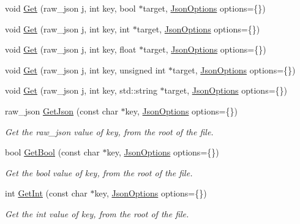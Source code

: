 \begin{DoxyCompactItemize}
void \hyperlink{classTarbora_1_1Json_a26d06b09cfa1ce6a53d9ad9dc19b0b5f}{Get} (raw\+\_\+json j, int key, bool $\ast$target, \hyperlink{structTarbora_1_1JsonOptions}{Json\+Options} options=\{\})
\item 
void \hyperlink{classTarbora_1_1Json_a050ea4e68695634b9d9719978faf35ba}{Get} (raw\+\_\+json j, int key, int $\ast$target, \hyperlink{structTarbora_1_1JsonOptions}{Json\+Options} options=\{\})
\item 
void \hyperlink{classTarbora_1_1Json_adda98aedf5694912dae77700250872c1}{Get} (raw\+\_\+json j, int key, float $\ast$target, \hyperlink{structTarbora_1_1JsonOptions}{Json\+Options} options=\{\})
\item 
void \hyperlink{classTarbora_1_1Json_ac3ceb8c8c992a316bdebed4924b4b2b0}{Get} (raw\+\_\+json j, int key, unsigned int $\ast$target, \hyperlink{structTarbora_1_1JsonOptions}{Json\+Options} options=\{\})
\item 
void \hyperlink{classTarbora_1_1Json_a0ccf25e00e728669ecad4cebc9ac7765}{Get} (raw\+\_\+json j, int key, std\+::string $\ast$target, \hyperlink{structTarbora_1_1JsonOptions}{Json\+Options} options=\{\})
\item 
raw\+\_\+json \hyperlink{classTarbora_1_1Json_a30c549b1306baccb78083771f30e5082}{Get\+Json} (const char $\ast$key, \hyperlink{structTarbora_1_1JsonOptions}{Json\+Options} options=\{\})
\begin{DoxyCompactList}\small\item\em Get the raw\+\_\+json value of {\itshape key}, from the root of the file. \end{DoxyCompactList}\item 
bool \hyperlink{classTarbora_1_1Json_a5ab7c5155726e886ccba57c8b0ed9a64}{Get\+Bool} (const char $\ast$key, \hyperlink{structTarbora_1_1JsonOptions}{Json\+Options} options=\{\})
\begin{DoxyCompactList}\small\item\em Get the bool value of {\itshape key}, from the root of the file. \end{DoxyCompactList}\item 
int \hyperlink{classTarbora_1_1Json_a345c02e8aebe8402c5cb4590ace0e340}{Get\+Int} (const char $\ast$key, \hyperlink{structTarbora_1_1JsonOptions}{Json\+Options} options=\{\})
\begin{DoxyCompactList}\small\item\em Get the int value of {\itshape key}, from the root of the file. \end{DoxyCompactList}\item 

\end{DoxyCompactItemize}
